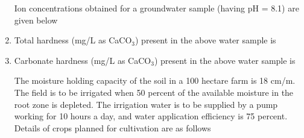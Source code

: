 \documentclass[journal,12pt,onecolumn]{IEEEtran}
\theoremstyle{remark}
\begin{document}
\begin{enumerate}
\setlength{\parskip}{0.5cm}


\noindent Ion concentrations obtained for a groundwater sample (having pH = 8.1) are given below
\begin{table}[H]
\label{table4}
\end{table}
\noindent\item Total hardness (mg/L as CaCO\(_3\)) present in the above water sample is

\setlength{\parskip}{0.5cm}

\hfill{}
\begin{enumerate}
\end{enumerate}
\setlength{\parskip}{0.5cm}
\noindent\item Carbonate hardness (mg/L as CaCO\(_3\)) present in the above water sample is

\setlength{\parskip}{0.5cm}

\hfill{}
\begin{enumerate}
\end{enumerate}

\setlength{\parskip}{0.5cm}


\noindent The moisture holding capacity of the soil in a 100 hectare farm is 18 cm/m. The field is to be irrigated when 50 percent of the available moisture in the root zone is depleted. The irrigation water is to be supplied by a pump working for 10 hours a day, and water application efficiency is 75 percent. Details of crops planned for cultivation are as follows


\end{enumerate}
\end{document}

